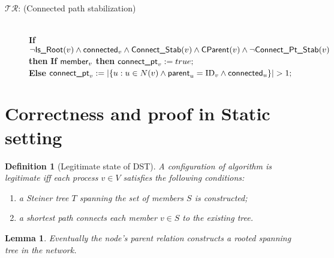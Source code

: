 \documentclass[11pt]{article}
\newtheorem{definition}{Definition}
\newtheorem{lemma}{Lemma}
\newcommand{\id}{\mbox{ID}}
\newcommand{\parent}{\mbox{\sf parent}}
\newcommand{\connect}{\mbox{\sf connected}}
\newcommand{\member}{\mbox{\sf member}}
\newcommand{\connectpt}{\mbox{\sf connect\_pt}}
\newcommand{\IsRoot}{\mbox{\sf Is\_Root}}
\newcommand{\CParent}{\mbox{\sf CParent}}
\newcommand{\ConnectS}{\mbox{\sf Connect\_Stab}}
\newcommand{\ConnectPtS}{\mbox{\sf Connect\_Pt\_Stab}}
\newcommand{\CRF}{$\mathcal{TR}$}
\begin{document}
\begin{small}
\begin{description}
\item[\CRF: (Connected path stabilization)]~\\\textbf{If} $\neg \IsRoot(v) \wedge \connect_v \wedge \ConnectS(v) \wedge \CParent(v) \wedge \neg \ConnectPtS(v)$\\ 
\textbf{then} \hspace*{0,1cm}\textbf{If} $\member_v$ \textbf{then} $\connectpt_v:=true;$ \\ \hspace*{0,8cm}\textbf{Else} $\connectpt_v := |\{u:u\in N(v) \wedge \parent_u = \id_v \wedge \connect_u\}|>1;$
\end{description}
\end{small}

\section{Correctness and proof in Static setting}
\label{sec:correction}

\begin{definition}[Legitimate state of DST]
\label{def:legitimate_state}
A configuration of algorithm is legitimate iff each process $v \in V$ satisfies the following conditions:
\begin{enumerate}
\item a Steiner tree $T$ spanning the set of members $S$ is constructed;
\item a shortest path connects each member $v \in S$ to the existing tree.
\end{enumerate}
\end{definition}



\begin{lemma}
\label{lem:correct1}
Eventually the node's parent relation constructs a rooted spanning tree in the network.
\end{lemma}
\end{document}
